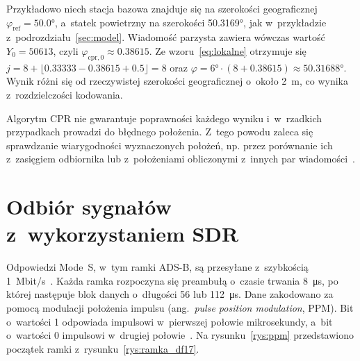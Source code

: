Przykładowo niech stacja bazowa znajduje się na szerokości geograficznej $\varphi_{\mathrm{ref}} = \ang{50.0}$, a~statek powietrzny na szerokości \ang{50.3169}, jak w~przykładzie z~podrozdziału~\ref{sec:model}. Wiadomość parzysta zawiera wówczas wartość $Y_0 = \num{50613}$, czyli $\varphi_{\mathrm{cpr},0} \approx \num{0.38615}$. Ze wzoru~\eqref{eq:lokalne} otrzymuje się $j = 8 + \lfloor \num{0.33333} - \num{0.38615} + \num{0.5} \rfloor = 8$ oraz $\varphi = \ang{6} \cdot (8 + \num{0.38615}) \approx \ang{50.31688}$. Wynik różni się od rzeczywistej szerokości geograficznej o~około \SI{2}{m}, co wynika z~rozdzielczości kodowania.

Algorytm CPR nie gwarantuje poprawności każdego wyniku i~w~rzadkich przypadkach prowadzi do błędnego położenia. Z~tego powodu zaleca się sprawdzanie wiarygodności wyznaczonych położeń, np. przez porównanie ich z~zasięgiem odbiornika lub z~położeniami obliczonymi z~innych par wiadomości~\cite{sun2021}.


\section{Odbiór sygnałów z~wykorzystaniem SDR}


\label{sec:sdr}

Odpowiedzi Mode~S, w~tym ramki ADS-B, są przesyłane z~szybkością \SI{1}{Mbit/s}~\cite{sun2021}. Każda ramka rozpoczyna się preambułą o~czasie trwania \SI{8}{\micro\second}, po której następuje blok danych o~długości 56 lub \SI{112}{\micro\second}. Dane zakodowano za pomocą modulacji położenia impulsu (ang.~\textit{pulse position modulation}, PPM). Bit o~wartości 1 odpowiada impulsowi w~pierwszej połowie mikrosekundy, a~bit o~wartości 0 impulsowi w~drugiej połowie~\cite{sun2021}. Na rysunku~\ref{rys:ppm} przedstawiono początek ramki z~rysunku~\ref{rys:ramka_df17}.

